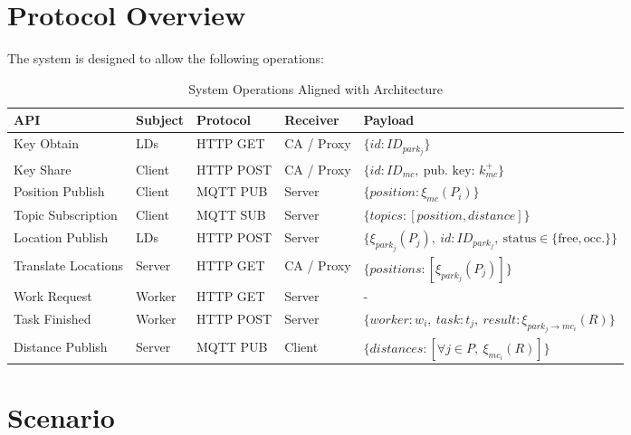 \documentclass[12pt,a4paper,twoside]{book}
\begin{document}

\section{Protocol Overview}
The system is designed to allow the following operations:

\begin{table}[h]
\renewcommand{\arraystretch}{1.3}
\small
\begin{tabularx}{\linewidth}{|l|X|X|X|p{4cm}|}
\hline
\textbf{API} & \textbf{Subject} & \textbf{Protocol} & \textbf{Receiver} & \textbf{Payload} \\ \hline

Key Obtain & LDs & HTTP GET & CA / Proxy & $\{id: ID_{park_j}\}$ \\ \hline

Key Share & Client & HTTP POST & CA / Proxy & $\{id: ID_{mc},\ \text{pub. key: } k_{mc}^+\}$ \\ \hline

Position Publish & Client & MQTT PUB & Server & $\{position: \xi_{mc}(P_i)\}$ \\ \hline

Topic Subscription & Client & MQTT SUB & Server & $\{topics: [position, distance]\}$ \\ \hline

Location Publish & LDs & HTTP POST & Server & $\{\xi_{park_j}(P_j),\ id: ID_{park_j},\ \text{status} \in \{\text{free}, \text{occ.}\}\}$ \\ \hline

Translate Locations & Server & HTTP GET & CA / Proxy & $\{positions: [\xi_{park_j}(P_{j})]\}$ \\ \hline

Work Request & Worker & HTTP GET & Server & - \\ \hline

Task Finished & Worker & HTTP POST & Server & $\{worker: w_i,\ task: t_j,\ result: \xi_{park_j \to mc_i}(R)\}$ \\ \hline

Distance Publish & Server & MQTT PUB & Client & $\{distances: [\forall j \in P,\ \xi_{mc_i}(R)]\}$ \\ \hline

\end{tabularx}
\caption{System Operations Aligned with Architecture}
\label{table:system-operations}
\end{table}

\newpage
\section{Scenario}
\end{document}
